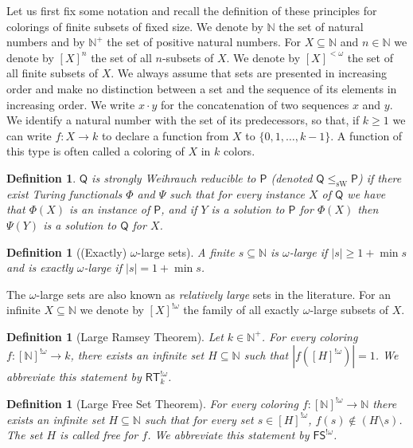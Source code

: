 \documentclass[10pt,a4paper]{article}
\newcommand{\Psf}{\mathsf{P}}
\newcommand{\Qsf}{\mathsf{Q}}
\newcommand{\FS}[0]{\mathsf{FS}}
\newcommand{\RT}[0]{\mathsf{RT}}
\newcommand{\NN}[0]{\mathbb{N}}
\newcommand{\sW}{\mathrm{sW}}
\numberwithin{theorem}{section}
\newtheorem{definition}[theorem]{Definition}
\begin{document}
Let us first fix some notation and recall the definition of these principles for colorings of finite subsets of fixed size. We denote by $\NN$ the set of natural numbers and by $\NN^+$ the set of positive natural numbers. For $X\subseteq \NN$ and $n \in \NN$
we denote by $[X]^{n}$ the set of all $n$-subsets of $X$. We denote by $[X]^{<\omega}$ the set of all finite subsets of $X$. We always assume that sets are presented in increasing order and make no distinction between a set and the sequence of its elements in increasing order. We write $x \cdot y$ for the concatenation of two sequences $x$ and $y$. We identify a natural number with the set of its predecessors, so that, if $k\geq 1$ we can write $f: X \to k$ to declare a function from $X$ to $\{0, 1, \dots, k-1\}$. A function of this type is often called a coloring of $X$ in $k$ colors.

\begin{definition}
    $\Qsf$ is {\em strongly Weihrauch reducible} to $\Psf$ (denoted $\Qsf \leq_{\sW} \Psf$) if there exist Turing functionals $\Phi$ and $\Psi$ such that for every instance $X$ of $\Qsf$ we have that $\Phi(X)$ is an instance of $\Psf$, and if $Y$ is a solution to $\Psf$ for $\Phi(X)$ then $\Psi(Y)$ is a solution to $\Qsf$ for $X$.
\end{definition}

\begin{definition}[(Exactly) $\omega$-large sets] 
A finite $s\subseteq \NN$ is $\omega$-large if $|s| \geq 1+\min s$ and is exactly $\omega$-large if $|s| = 1+\min s$.
\end{definition}

The $\omega$-large sets are also known as {\em relatively large} sets in the literature. For an infinite $X\subseteq \NN$ we denote by $[X]^{!\omega}$ the family of all exactly $\omega$-large subsets of $X$.

\begin{definition}[Large Ramsey Theorem]\label{def:largeRT} Let $k\in \NN^+$. 
For every coloring $f:[\NN]^{!\omega} \to k$, there exists an infinite set $H \subseteq \NN$ such that $|f([H]^{!\omega})| = 1$. We abbreviate this statement by  $\RT^{!\omega}_k$.
\end{definition}

\begin{definition}[Large Free Set Theorem]\label{def:large_free}
For every coloring $f:[\NN]^{!\omega} \to \NN$ there exists an infinite set $H\subseteq\NN$ such that for every set $s \in [H]^{!\omega}$, $f(s) \notin (H \setminus s)$. The set $H$ is called \emph{free} for $f$. We abbreviate this statement by $\FS^{!\omega}$. 
\end{definition}
\end{document}

